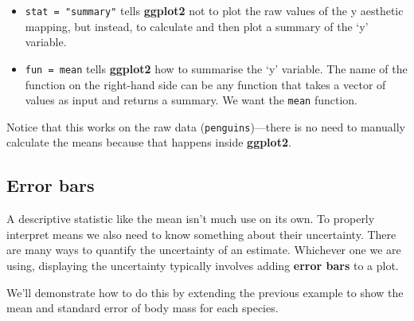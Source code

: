 \documentclass[
]{book}
\providecommand{\tightlist}{%
  \setlength{\itemsep}{0pt}\setlength{\parskip}{0pt}}
\newenvironment{greybox}{
  \definecolor{shadecolor}{rgb}{0.95,0.95,0.95}  %
  \color{black}
  \begin{shaded}}
 {\end{shaded}}
\newenvironment{infobox}[1]
  {
  \begin{itemize}
  \renewcommand{\labelitemi}{
    \raisebox{-.7\height}[0pt][0pt]{
      {\setkeys{Gin}{width=3em,keepaspectratio}
        \texttt{[image: images/\#1]}}
    }
  }
  \setlength{\fboxsep}{1em}
  \begin{greybox}
  \item
  }
  {
  \end{greybox}
  \end{itemize}
  }
\begin{document}
\begin{infobox}{information}
\begin{itemize}
\tightlist
\item
  \texttt{stat\ =\ "summary"} tells \textbf{ggplot2} not to plot the raw values of the y aesthetic mapping, but instead, to calculate and then plot a summary of the `y' variable.
\item
  \texttt{fun\ =\ mean} tells \textbf{ggplot2} how to summarise the `y' variable. The name of the function on the right-hand side can be any function that takes a vector of values as input and returns a summary. We want the \texttt{mean} function.
\end{itemize}

Notice that this works on the raw data (\texttt{penguins})---there is no need to manually calculate the means because that happens inside \textbf{ggplot2}.

\end{infobox}

\hypertarget{error-bars}{%
\subsection{Error bars}\label{error-bars}}

A descriptive statistic like the mean isn't much use on its own. To properly interpret means we also need to know something about their uncertainty. There are many ways to quantify the uncertainty of an estimate. Whichever one we are using, displaying the uncertainty typically involves adding \textbf{error bars} to a plot.

We'll demonstrate how to do this by extending the previous example to show the mean and standard error of body mass for each species.
\end{document}
